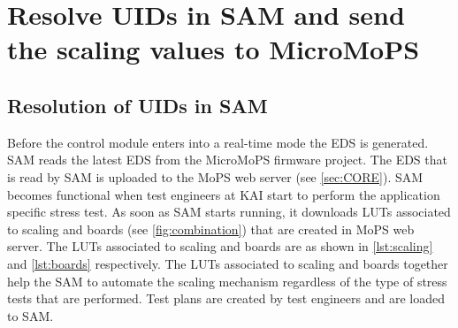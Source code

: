 \section{Resolve UIDs in SAM and send the scaling values to MicroMoPS}\label{sec:host application}

\subsection{Resolution of UIDs in SAM}\label{sec:uidResolution}
Before the control module enters into a real-time mode the \acrshort{EDS} is generated. SAM reads the latest EDS from the MicroMoPS firmware project. 
The EDS that is read by SAM is uploaded to the MoPS web server (see \cref{sec:CORE}). 
SAM becomes functional when test engineers at KAI start to perform the application specific stress test. 
As soon as SAM starts running, it downloads \glspl{LUT} associated to scaling and boards (see \cref{fig:combination}) that are created in MoPS web server. 
The \glspl{LUT} associated to scaling and boards  are as shown in \cref{lst:scaling} and \cref{lst:boards} respectively. 
The \glspl{LUT} associated to scaling and boards together help the SAM to automate the scaling mechanism regardless of the type of stress tests that are performed. Test plans are created by test engineers and are loaded to SAM.


